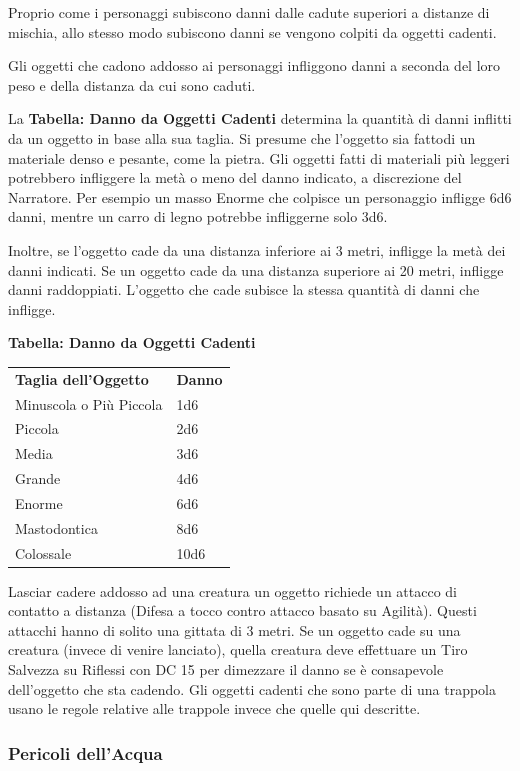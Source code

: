 \documentclass[a4paper,11pt,twoside,openany]{book}
\begin{document}
{\label{oggetti-cadenti}

Proprio come i personaggi subiscono danni dalle cadute superiori a distanze di mischia, allo stesso modo subiscono danni se vengono colpiti da oggetti cadenti.

Gli oggetti che cadono addosso ai personaggi infliggono danni a seconda del loro peso e della distanza da cui sono caduti.

La \textbf{Tabella: Danno da Oggetti Cadenti} determina la quantità di danni inflitti da un oggetto in base alla sua taglia. Si presume che l'oggetto sia fattodi un materiale denso e pesante, come la pietra. 
Gli oggetti fatti di materiali più leggeri potrebbero infliggere la metà o meno del danno indicato, a discrezione del Narratore. Per esempio un masso Enorme che colpisce un personaggio infligge 6d6 danni, mentre un carro di legno potrebbe infliggerne solo 3d6.

Inoltre, se l'oggetto cade da una distanza inferiore ai 3 metri, infligge la metà dei danni indicati. Se un oggetto cade da una distanza superiore ai 20 metri, infligge danni raddoppiati. L'oggetto che cade subisce la stessa quantità di danni che infligge.

\bigskip

\textbf{Tabella: Danno da Oggetti Cadenti}

\begin{tabular}{ll}
\toprule
\textbf{Taglia dell'Oggetto} & \textbf{Danno}\tabularnewline
Minuscola o Più Piccola & 1d6\tabularnewline
Piccola & 2d6\tabularnewline
Media & 3d6\tabularnewline
Grande & 4d6\tabularnewline
Enorme & 6d6\tabularnewline
Mastodontica & 8d6\tabularnewline
Colossale & 10d6\tabularnewline

\end{tabular}

\bigskip

Lasciar cadere addosso ad una creatura un oggetto richiede un attacco di contatto a distanza (Difesa a tocco contro attacco basato su Agilità). Questi attacchi hanno di solito una gittata di 3 metri. Se un oggetto cade su una creatura (invece di venire lanciato), quella creatura deve effettuare un Tiro Salvezza su Riflessi con DC 15 per dimezzare il danno se è consapevole dell'oggetto che sta cadendo. Gli oggetti cadenti che sono parte di una trappola usano le regole relative alle trappole invece che quelle qui descritte.

\subsubsection{Pericoli dell'Acqua}

}
\end{document}
